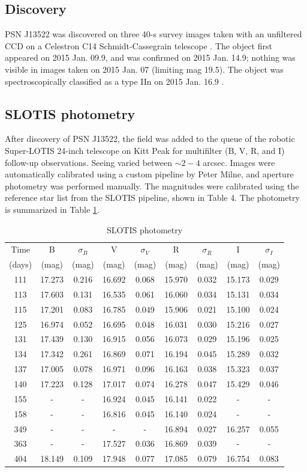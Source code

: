 \documentclass[a4paper,fleqn,usenatbib]{mnras}
\begin{document}
\subsection{Discovery} \label{obs:disc}
PSN J13522 was discovered on three 40-s survey images taken with an unfiltered CCD on a Celestron C14 Schmidt-Cassegrain telescope \citep{Jin15}. The object first appeared on 2015 Jan. 09.9, and was confirmed on 2015 Jan. 14.9; nothing was visible in images taken on 2015 Jan. 07 (limiting mag 19.5). The object was spectroscopically classified as a type IIn on 2015 Jan. 16.9 \citep{Zha15}.

\subsection{SLOTIS photometry} \label{obs:slotis}
After discovery of PSN J13522, the field was added to the queue of the robotic Super-LOTIS 24-inch telescope \citep[SLOTIS;][]{Wil08} on Kitt Peak for multifilter (B, V, R, and I) follow-up observations. Seeing varied between $\sim2-4$ arcsec. Images were automatically calibrated using a custom pipeline by Peter Milne, and aperture photometry was performed manually. The magnitudes were calibrated using the reference star list from the SLOTIS pipeline, shown in Table 4. The photometry is summarized in Table \ref{tab:slotis}.

\begin{table}
\caption{SLOTIS photometry}
\centering
\label{tab:slotis}
\begin{tabular}{ccccccccc}
\hline
Time &B &$\sigma_B$ &V &$\sigma_V$ &R &$\sigma_R$ &I &$\sigma_I$ \\
(days) &(mag) &(mag) &(mag) &(mag) &(mag) &(mag) &(mag) &(mag) \\
\hline
111 &17.273 &0.216 &16.692 &0.068 &15.970 &0.032 &15.173 &0.029 \\
113 &17.603 &0.131 &16.535 &0.061 &16.060 &0.034 &15.131 &0.034 \\
115 &17.201 &0.083 &16.785 &0.049 &15.906 &0.021 &15.100 &0.024 \\
125 &16.974 &0.052 &16.695 &0.048 &16.031 &0.030 &15.216 &0.027 \\
131 &17.439 &0.130 &16.915 &0.056 &16.073 &0.029 &15.196 &0.025 \\
134 &17.342 &0.261 &16.869 &0.071 &16.194 &0.045 &15.289 &0.032 \\
137 &17.005 &0.078 &16.971 &0.096 &16.163 &0.038 &15.323 &0.037 \\
140 &17.223 &0.128 &17.017 &0.074 &16.278 &0.047 &15.429 &0.046 \\
155 &-      &-     &16.924 &0.045 &16.141 &0.022 &-      &- \\
158 &-      &-     &16.816 &0.045 &16.140 &0.024 &-      &- \\
349 &-      &-     &-      &-     &16.894 &0.027 &16.257 &0.055 \\
363 &-      &-     &17.527 &0.036 &16.869 &0.039 &-      &- \\
404 &18.149 &0.109 &17.948 &0.077 &17.085 &0.079 &16.754 &0.083 \\
\hline
\end{tabular}
\end{table}
\end{document}
